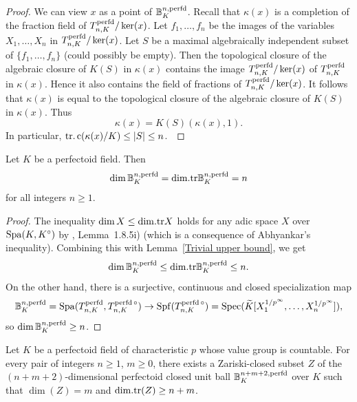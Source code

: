 \begin{proof}We can view $x$ as a point of $\mathbb{B}_{K}^{n,\operatorname{perfd}}$. Recall that $\kappa(x)$ is a completion of the fraction field of $T_{n, K}^{\operatorname{perfd}}/\ker(x)$. Let $f_1,\dots, f_n$ be the images of the variables $X_1, \dots, X_n$ in $T_{n, K}^{\operatorname{perfd}}/\ker(x)$. 
Let $S$ be a maximal algebraically independent subset of $\{f_1,\dots, f_n\}$ (could possibly be empty). Then the topological closure of the algebraic closure of $K(S)$ in $\kappa(x)$ contains the image $T_{n, K}^{\operatorname{perfd}}/\ker(x)$ of $T_{n, K}^{\operatorname{perfd}}$ in $\kappa(x)$. 
Hence it also contains the field of fractions of $T_{n, K}^{\operatorname{perfd}}/\ker(x)$. It follows that $\kappa(x)$ is equal to the topological closure of the algebraic closure of $K(S)$ in $\kappa(x)$. 
Thus \begin{equation*}\kappa(x)=K(S)(\kappa(x), 1).\end{equation*}In particular, $\operatorname{tr.c}(\kappa(x)/K)\leq \vert S\vert\leq n$. \end{proof}
\begin{cor}\label{Dimension of the perfectoid closed unit ball}Let $K$ be a perfectoid field. Then \begin{equation*}\dim\mathbb{B}_{K}^{n,\operatorname{perfd}}=\mathrm{dim.tr}\mathbb{B}_{K}^{n,\operatorname{perfd}}=n\end{equation*}for all integers $n\geq1$. \end{cor}
\begin{proof}The inequality $\dim X\leq \mathrm{dim.tr} X$ holds for any adic space $X$ over $\operatorname{Spa}(K, K^{\circ})$ by \cite{Huber96}, Lemma~1.8.5i) (which is a consequence of Abhyankar's inequality). Combining this with Lemma~\ref{Trivial upper bound}, we get \begin{equation*}\dim\mathbb{B}_{K}^{n,\operatorname{perfd}}\leq\mathrm{dim.tr}\mathbb{B}_{K}^{n,\operatorname{perfd}}\leq n.\end{equation*}On the other hand, there is a surjective, continuous and closed specialization map \begin{equation*}\mathbb{B}_{K}^{n,\operatorname{perfd}}=\operatorname{Spa}(T_{n, K}^{\operatorname{perfd}}, T_{n, K}^{\operatorname{perfd}\circ})\to \operatorname{Spf}(T_{n, K}^{\operatorname{perfd}\circ})=\operatorname{Spec}(\widetilde{K}[X_{1}^{1/p^{\infty}}, \dots, X_{n}^{1/p^{\infty}}]),\end{equation*}so $\dim\mathbb{B}_{K}^{n,\operatorname{perfd}}\geq n$. \end{proof} 
\begin{thm}
\label{Main theorem 3}
Let $K$ be a perfectoid field of characteristic $p$ whose value group is countable. 
For every pair of integers $n\geq1$, $m\geq0$, there exists a Zariski-closed subset $Z$ of the $(n+m+2)$-dimensional
perfectoid closed unit ball $\mathbb{B}_{K}^{n+m+2,\operatorname{perfd}}$ over $K$ such that $\dim(Z)=m$ and
$\mathrm{dim.tr}(Z)\geq n+m$.
\end{thm}
